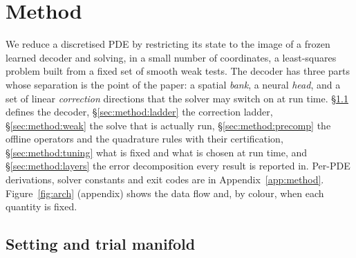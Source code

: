 %
%
%

\section{Method}
\label{sec:method}

We reduce a discretised PDE by restricting its state to the image of a frozen
learned decoder and solving, in a small number of coordinates, a least-squares
problem built from a fixed set of smooth weak tests. The decoder has three parts
whose separation is the point of the paper: a spatial \emph{bank}, a neural
\emph{head}, and a set of linear \emph{correction} directions that the solver may
switch on at run time. \S\ref{sec:method:manifold} defines the decoder,
\S\ref{sec:method:ladder} the correction ladder, \S\ref{sec:method:weak} the
solve that is actually run, \S\ref{sec:method:precomp} the offline operators and
the quadrature rules with their certification, \S\ref{sec:method:tuning} what is
fixed and what is chosen at run time, and \S\ref{sec:method:layers} the error
decomposition every result is reported in. Per-PDE derivations, solver constants
and exit codes are in Appendix~\ref{app:method}.
Figure~\ref{fig:arch} (appendix) shows the data flow and, by colour, when
each quantity is fixed.

\subsection{Setting and trial manifold}
\label{sec:method:manifold}

